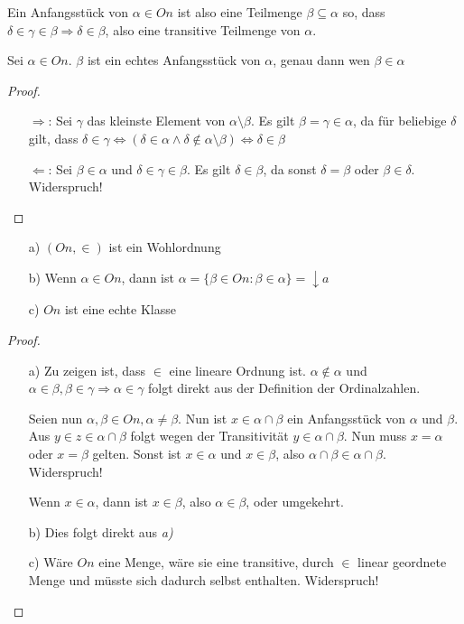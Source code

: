 Ein Anfangsstück von $\alpha \in On$ ist also eine Teilmenge $\beta\subseteq \alpha$ so, dass $\delta\in\gamma\in \beta\Rightarrow \delta\in\beta$, also eine transitive Teilmenge von $\alpha$.

\begin{lemma}
	Sei $\alpha\in On$. $\beta$ ist ein echtes Anfangsstück von $\alpha$, genau dann wen $\beta \in \alpha$
\end{lemma}
\begin{proof}
	\begin{itemize}
		\item[$\Rightarrow$:] Sei $\gamma$ das kleinste Element von $\alpha\setminus \beta$. 
		Es gilt $\beta=\gamma\in \alpha$, da für beliebige $\delta$ gilt, dass $\delta\in\gamma \Leftrightarrow (\delta\in\alpha \land \delta\notin\alpha\setminus\beta) \Leftrightarrow \delta\in\beta$
		\item[$\Leftarrow$:] Sei $\beta\in\alpha$ und $\delta\in\gamma\in\beta$. Es gilt $\delta\in\beta$, da sonst $\delta=\beta$ oder $\beta\in\delta$. Widerspruch!
	\end{itemize}
\end{proof}

\begin{satz}
	\begin{itemize}
		\item[a)] $(On,\in)$ ist ein Wohlordnung
		\item[b)] Wenn $\alpha\in On$, dann ist $\alpha=\{\beta\in On:\beta\in\alpha\}=\downarrow a$
		\item[c)] $On$ ist eine echte Klasse
	\end{itemize}
\end{satz}
\begin{proof}
	\begin{itemize}
		\item[a)] Zu zeigen ist, dass $\in$ eine lineare Ordnung ist. $\alpha \notin \alpha$ und $\alpha\in\beta, \beta\in \gamma\Rightarrow \alpha\in\gamma$ folgt direkt aus der Definition der Ordinalzahlen.
		
		Seien nun $\alpha,\beta\in On, \alpha\neq\beta$. Nun ist $x\in\alpha\cap\beta$ ein Anfangsstück von $\alpha$ und $\beta$. 
		Aus $y\in z \in \alpha\cap \beta$ folgt wegen der Transitivität $y\in\alpha\cap \beta$. Nun muss $x=\alpha$ oder $x=\beta$ gelten. Sonst ist $x\in \alpha$ und $x\in\beta$, also $\alpha\cap\beta \in \alpha\cap\beta$. Widerspruch!
		
		Wenn $x\in\alpha$, dann ist $x\in\beta$, also $\alpha \in \beta$, oder umgekehrt.
		
		\item[b)] Dies folgt direkt aus \textit{a)}
		
		\item[c)] Wäre $On$ eine Menge, wäre sie eine transitive, durch $\in$ linear geordnete Menge und müsste sich dadurch selbst enthalten. Widerspruch!
	\end{itemize}
\end{proof}

